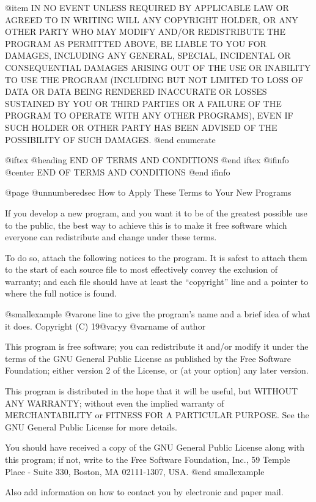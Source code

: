 @item
IN NO EVENT UNLESS REQUIRED BY APPLICABLE LAW OR AGREED TO IN WRITING
WILL ANY COPYRIGHT HOLDER, OR ANY OTHER PARTY WHO MAY MODIFY AND/OR
REDISTRIBUTE THE PROGRAM AS PERMITTED ABOVE, BE LIABLE TO YOU FOR DAMAGES,
INCLUDING ANY GENERAL, SPECIAL, INCIDENTAL OR CONSEQUENTIAL DAMAGES ARISING
OUT OF THE USE OR INABILITY TO USE THE PROGRAM (INCLUDING BUT NOT LIMITED
TO LOSS OF DATA OR DATA BEING RENDERED INACCURATE OR LOSSES SUSTAINED BY
YOU OR THIRD PARTIES OR A FAILURE OF THE PROGRAM TO OPERATE WITH ANY OTHER
PROGRAMS), EVEN IF SUCH HOLDER OR OTHER PARTY HAS BEEN ADVISED OF THE
POSSIBILITY OF SUCH DAMAGES.
@end enumerate

@iftex
@heading END OF TERMS AND CONDITIONS
@end iftex
@ifinfo
@center END OF TERMS AND CONDITIONS
@end ifinfo

@page
@unnumberedsec How to Apply These Terms to Your New Programs

  If you develop a new program, and you want it to be of the greatest
possible use to the public, the best way to achieve this is to make it
free software which everyone can redistribute and change under these terms.

  To do so, attach the following notices to the program.  It is safest
to attach them to the start of each source file to most effectively
convey the exclusion of warranty; and each file should have at least
the ``copyright'' line and a pointer to where the full notice is found.

@smallexample
@var{one line to give the program's name and a brief idea of what it does.}
Copyright (C) 19@var{yy}  @var{name of author}

This program is free software; you can redistribute it and/or modify
it under the terms of the GNU General Public License as published by
the Free Software Foundation; either version 2 of the License, or
(at your option) any later version.

This program is distributed in the hope that it will be useful,
but WITHOUT ANY WARRANTY; without even the implied warranty of
MERCHANTABILITY or FITNESS FOR A PARTICULAR PURPOSE.  See the
GNU General Public License for more details.

You should have received a copy of the GNU General Public License
along with this program; if not, write to the Free Software
Foundation, Inc., 59 Temple Place - Suite 330,
Boston, MA 02111-1307, USA.
@end smallexample

Also add information on how to contact you by electronic and paper mail.

